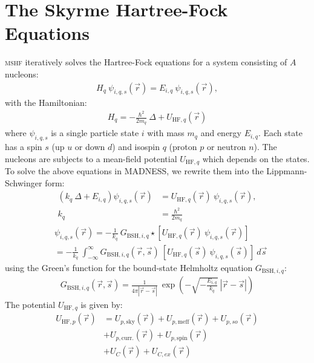\documentclass[4p]{elsarticle}
\begin{document}
\section{The Skyrme Hartree-Fock Equations}
\textsc{mshf} iteratively solves the Hartree-Fock equations for a system consisting of $A$ nucleons:
\begin{align}
H_q \:  \psi_{i,q,s} (\vec{r}) = E_{i,q} \: \psi_{i,q,s} (\vec{r}),
\label{HFeq1}
\end{align}
with the Hamiltonian:
\begin{align}
H_q = -  \frac{\hbar^2}{2 m_q}  \: \Delta + U_{\mathrm{HF},q} (\vec{r})
\label{HFeq2}
\end{align}
where $\psi_{i,q,s}$ is a single particle state $i$ with mass $m_q$ and energy $E_{i,q}$. Each state has a spin $s$ (up $u$ or down $d$) and isospin $q$ (proton $p$ or neutron $n$). The nucleons are subjects to a mean-field potential $U_{\mathrm{HF},q}$ which depends on the states. To solve the above equations in \textsc{MADNESS}, we rewrite them into the Lippmann-Schwinger form:
\begin{align}
\left( k_q \: \Delta+ E_{i,q} \right) \psi_{i,q,s} (\vec{r}) &= U_{\mathrm{HF},q} (\vec{r}) \: \psi_{i,q,s} (\vec{r}), \\
 k_q & =  \frac{\hbar^2}{2 m_q} 
\end{align}
\begin{align}
&\psi_{i,q,s} (\vec{r}) = - \frac{1}{k_q} \: G_{\mathrm{BSH},i,q}  \star \left[ U_{\mathrm{HF},q} (\vec{r}) \: \psi_{i,q,s} (\vec{r}) \right] \\
&= - \frac{1}{k_q} \: \int_{-\infty}^{\infty} G_{\mathrm{BSH},i,q} (\vec{r}, \vec{s} ) \: \left[U_{\mathrm{HF},q} (\vec{s}) \: \psi_{i,q,s} (\vec{s})\right] \: d\vec{s} 
\label{conv1}
\end{align}
using the Green's function for the bound-state Helmholtz equation $G_{\mathrm{BSH},i,q}$:
\begin{align}
G_{\mathrm{BSH},i,q}  ( \vec{r} , \vec{s} ) = \frac{1}{ 4 \pi |\vec{r} - \vec{s}|} \: \exp\left(-\sqrt{ - \frac{E_{i,q} }{ k_q}} \: | \vec{r} - \vec{s} |\right)
\label{Greens}
\end{align}
The potential $U_{\mathrm{HF},q}$ is given by: 
\begin{align} 
U_{\mathrm{HF}, p} (\vec{r}) &= U_{p,\mathrm{sky}} (\vec{r}) + U_{p, \mathrm{meff}} (\vec{r}) + U_{p, so} (\vec{r}) \nonumber\\
& + U_{p, \mathrm{curr.}} (\vec{r}) + U_{p, \mathrm{spin}} (\vec{r}) \nonumber\\
&+ U_{C} (\vec{r}) + U_{C,ex} (\vec{r})
\label{Uprotons}
\end{align}
\end{document}
